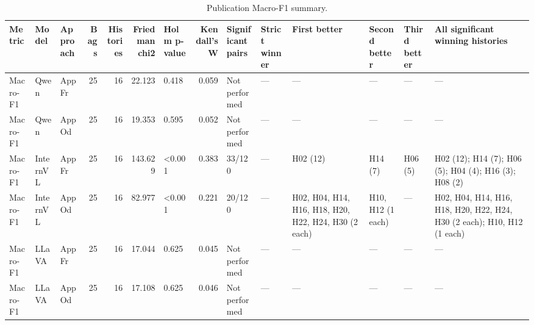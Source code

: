 \begin{table}[tbp]
\caption{Publication Macro-F1 summary.}
\label{tab:rq3-macro-f1-summary}
\begin{tabular}{lllrrrlrllllll}
\toprule
Metric & Model & Approach & Bags & Histories & Friedman chi2 & Holm p-value & Kendall's W & Significant pairs & Strict winner & First better & Second better & Third better & All significant winning histories \\
\midrule
Macro-F1 & Qwen & AppFr & 25 & 16 & 22.123 & 0.418 & 0.059 & Not performed & — & — & — & — & — \\
Macro-F1 & Qwen & AppOd & 25 & 16 & 19.353 & 0.595 & 0.052 & Not performed & — & — & — & — & — \\
Macro-F1 & InternVL & AppFr & 25 & 16 & 143.629 & <0.001 & 0.383 & 33/120 & — & H02 (12) & H14 (7) & H06 (5) & H02 (12); H14 (7); H06 (5); H04 (4); H16 (3); H08 (2) \\
Macro-F1 & InternVL & AppOd & 25 & 16 & 82.977 & <0.001 & 0.221 & 20/120 & — & H02, H04, H14, H16, H18, H20, H22, H24, H30 (2 each) & H10, H12 (1 each) & — & H02, H04, H14, H16, H18, H20, H22, H24, H30 (2 each); H10, H12 (1 each) \\
Macro-F1 & LLaVA & AppFr & 25 & 16 & 17.044 & 0.625 & 0.045 & Not performed & — & — & — & — & — \\
Macro-F1 & LLaVA & AppOd & 25 & 16 & 17.108 & 0.625 & 0.046 & Not performed & — & — & — & — & — \\
\bottomrule
\end{tabular}
\end{table}

